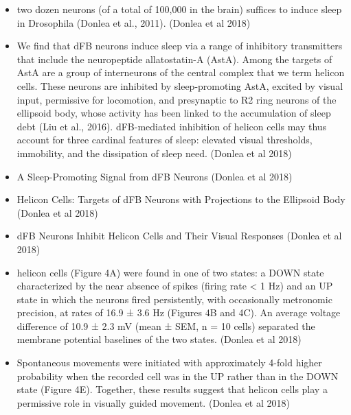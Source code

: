 \documentclass[11pt]{article}
\begin{document}
\begin{itemize}
    \item two dozen neurons (of a total of 100,000 in the brain) suffices to induce sleep in Drosophila (Donlea et al., 2011).
    \cite{donleaRecurrentCircuitryBalancing2018} (Donlea et al 2018)

    \item We find that dFB neurons induce sleep via a range of inhibitory transmitters that include the neuropeptide allatostatin-A (AstA). Among the targets of AstA are a group of interneurons of the central complex that we term helicon cells. These neurons are inhibited by sleep-promoting AstA, excited by visual input, permissive for locomotion, and presynaptic to R2 ring neurons of the ellipsoid body, whose activity has been linked to the accumulation of sleep debt (Liu et al., 2016). dFB-mediated inhibition of helicon cells may thus account for three cardinal features of sleep: elevated visual thresholds, immobility, and the dissipation of sleep need.
    \cite{donleaRecurrentCircuitryBalancing2018} (Donlea et al 2018)

    \item A Sleep-Promoting Signal from dFB Neurons
    \cite{donleaRecurrentCircuitryBalancing2018} (Donlea et al 2018)

    \item Helicon Cells: Targets of dFB Neurons with Projections to the Ellipsoid Body
    \cite{donleaRecurrentCircuitryBalancing2018} (Donlea et al 2018)

    \item dFB Neurons Inhibit Helicon Cells and Their Visual Responses
    \cite{donleaRecurrentCircuitryBalancing2018} (Donlea et al 2018)

    \item helicon cells (Figure 4A) were found in one of two states: a DOWN state characterized by the near absence of spikes (firing rate < 1 Hz) and an UP state in which the neurons fired persistently, with occasionally metronomic precision, at rates of 16.9 ± 3.6 Hz (Figures 4B and 4C). An average voltage difference of 10.9 ± 2.3 mV (mean ± SEM, n = 10 cells) separated the membrane potential baselines of the two states.
    \cite{donleaRecurrentCircuitryBalancing2018} (Donlea et al 2018)

    \item Spontaneous movements were initiated with approximately 4-fold higher probability when the recorded cell was in the UP rather than in the DOWN state (Figure 4E). Together, these results suggest that helicon cells play a permissive role in visually guided movement.
    \cite{donleaRecurrentCircuitryBalancing2018} (Donlea et al 2018)


\end{itemize}
\end{document}
